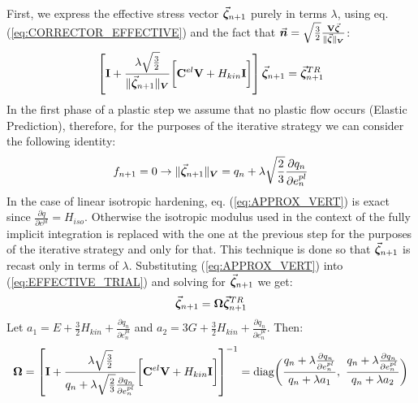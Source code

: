 \begin{appendices}
First, we express the effective stress vector $\vec{\bm{\zeta}}_{n+1}$ purely in
terms $\lambda$, using 
eq. (\ref{eq:CORRECTOR_EFFECTIVE}) and the fact that $\vec{\bm{n}} =
\sqrt{\frac{3}{2}}\frac{\mathbf{V}\vec{\bm{\zeta}}}{\Vert\vec{\bm{\zeta}}\Vert_{\bm{V}}}$:
\begin{equation}
	\left[\mathbf{I}+\frac{\lambda\sqrt{\frac{3}{2}}}{\Vert\vec{\bm{\zeta}}_{n+1}\Vert_{\bm{V}}}\bigg[\mathbf{C}^{el}\mathbf{V}+H_{kin}\mathbf{I}\bigg]\right]\vec{\bm{\zeta}}_{n+1}
	= \vec{\bm{\zeta}}^{TR}_{n+1}
	\label{eq:EFFECTIVE_TRIAL}
\end{equation}
In the first phase of a plastic step we assume that no plastic flow occurs
(Elastic Prediction), therefore, for the purposes of the iterative strategy we
can consider the following identity:
\begin{equation}
	f_{n+1} = 0 \rightarrow
	\Vert\vec{\bm{\zeta}}_{n+1}\Vert_{\bm{V}}= q_n +
	\lambda\sqrt{\frac{2}{3}}\frac{\partial q_n}{\partial e^{pl}_n}
	\label{eq:APPROX_VERT}
\end{equation}
In the case of linear isotropic hardening, eq. (\ref{eq:APPROX_VERT}) is exact
since $\frac{\partial q}{\partial e^{pl}} = H_{iso}$.
Otherwise the isotropic modulus used in the context of the fully implicit 
integration is replaced with the one at the previous step for the purposes of
the iterative strategy and only for that. This technique is done so that
$\vec{\bm{\zeta}}_{n+1}$ is recast only in terms of $\lambda$.
Substituting (\ref{eq:APPROX_VERT}) into (\ref{eq:EFFECTIVE_TRIAL}) and solving
for $\vec{\bm{\zeta}}_{n+1}$ we get:
\begin{equation}
	\vec{\bm{\zeta}}_{n+1} = \mathbf{\Omega}\vec{\bm{\zeta}}^{TR}_{n+1}
	\label{eq:ZETA2}
\end{equation}
\noindent  
Let $a_1 = E+\frac{3}{2}H_{kin} + \frac{\partial q_n}{\partial e^{pl}_n}$ and 
$a_2 = 3G+\frac{3}{2}H_{kin} + \frac{\partial q_n}{\partial e^{pl}_n}$. Then:
\begin{equation}
	\bmat{\Omega} =
	\left[\bmat{I}+\frac{\lambda\sqrt{\frac{3}{2}}}{q_n +
		\lambda\sqrt{\frac{2}{3}}\frac{\partial q_n}{\partial
			e^{pl}_n}}\bigg[\bmat{C}^{el}\bmat{V}+H_{kin}\bmat{I}\bigg]\right]^{-1}
			 =
	\text{diag}\bigg(\frac{q_n+\lambda\frac{\partial q_n}{\partial
			e^{pl}_n}}{q_n+\lambda a_1},\ \frac{q_n+\lambda\frac{\partial 
			q_n}{\partial
			e^{pl}_n}}{q_n+\lambda a_2}\bigg)
	\label{eq:OMEGA}
\end{equation}


\end{appendices}
